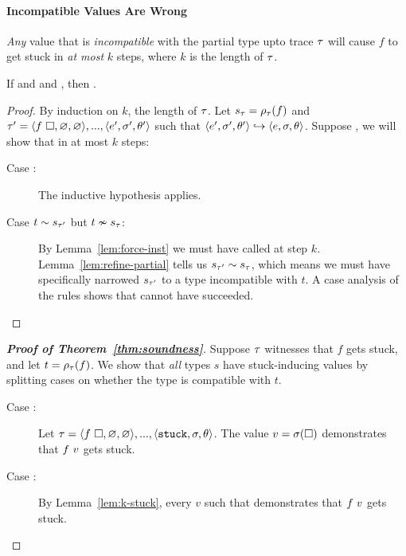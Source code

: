 \paragraph{Incompatible Values Are Wrong}
%
\emph{Any} value that is \emph{incompatible} with
the partial type upto trace $\tau$ will cause $f$ to get stuck
in \emph{at most} $k$ steps, where $k$ is the length of $\tau$.
%
\begin{lem}
\label{lem:k-stuck}
  If  and
      and
     ,
  then
     .
\end{lem}
\begin{proof}
  By induction on $k$, the length of $\tau$.
  Let $s_{\tau} = \rho_{\tau}(f)$ and
  $\tau' = \langle f\ \square{}, \varnothing, \varnothing \rangle,...,\langle e', \sigma', \theta' \rangle$
  such that $\langle e', \sigma', \theta' \rangle \hookrightarrow \langle e, \sigma, \theta \rangle$.
  Suppose , we
  will show that 
  in at most $k$ steps:
%
  \begin{description}
  \item [Case :]
    The inductive hypothesis applies.
  \item [Case $t \sim s_{\tau'}$ but $t \nsim s_{\tau}$:]
    By Lemma~\ref{lem:force-inst} we must have called \forcesym at step
    $k$.
    Lemma~\ref{lem:refine-partial} tells us
    $s_{\tau'} \sim s_{\tau}$, which means we must have
    specifically narrowed $s_{\tau'}$ to a type incompatible with $t$.
    A case analysis of the rules shows that \forcesym cannot have
    succeeded.
  \end{description}
\end{proof}

\begin{proof}[\textbf{Proof of Theorem~\ref{thm:soundness}}]
%
Suppose $\tau$ witnesses that $f$ gets stuck,
and let $t = \rho_{\tau}(f)$.
We show that \emph{all} types $s$ have stuck-inducing
values by splitting cases on whether the type is
compatible with $t$. %
%
\begin{description}
\item [Case :]
  Let $\tau = \langle f\ \square{}, \varnothing, \varnothing \rangle,...,\langle \mathtt{stuck}, \sigma, \theta \rangle$.
  The value $v = \sigma(\square)$ demonstrates that
  $f\ v$ gets stuck.
\item [Case :] By Lemma~\ref{lem:k-stuck}, every $v$
  such that  demonstrates that $f\ v$ gets stuck.
\end{description}
\end{proof}

